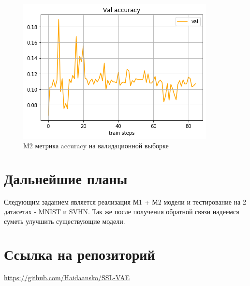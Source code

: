 \documentclass{article}
\begin{document}
\begin{figure}[htbp]
    \centering
    \includegraphics[scale=0.6]{val}
    \caption{M2 метрика accuracy на валидационной выборке}
\end{figure}
\newpage
\section{Дальнейшие планы}
Следующим заданием является реализация М1 + М2 модели и тестирование на 2 датасетах - MNIST и SVHN. Так же после получения обратной связи надеемся суметь улучшить существующие модели.  

\section{Ссылка на репозиторий}
\url{https://github.com/Haidaansko/SSL-VAE}
\end{document}
